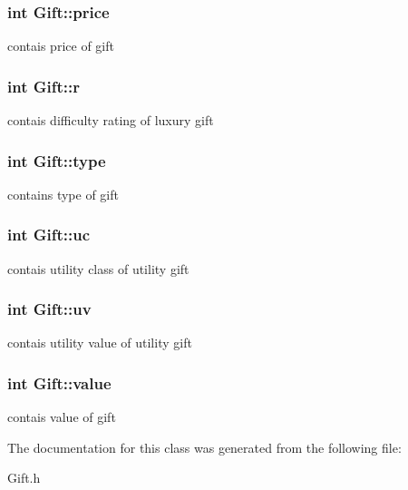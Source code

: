 \subsubsection[{\texorpdfstring{price}{price}}]{\setlength{\rightskip}{0pt plus 5cm}int Gift\+::price}\hypertarget{classGift_ad795362f286e8d5d73514fb64ac478b8}{}\label{classGift_ad795362f286e8d5d73514fb64ac478b8}
contais price of gift 
\subsubsection[{\texorpdfstring{r}{r}}]{\setlength{\rightskip}{0pt plus 5cm}int Gift\+::r}\hypertarget{classGift_a0ab190c8bc8c7fb9e9f03d1330e8364d}{}\label{classGift_a0ab190c8bc8c7fb9e9f03d1330e8364d}
contais difficulty rating of luxury gift 
\subsubsection[{\texorpdfstring{type}{type}}]{\setlength{\rightskip}{0pt plus 5cm}int Gift\+::type}\hypertarget{classGift_a63fb63fdc6f0821417039da90a54ad4c}{}\label{classGift_a63fb63fdc6f0821417039da90a54ad4c}
contains type of gift 
\subsubsection[{\texorpdfstring{uc}{uc}}]{\setlength{\rightskip}{0pt plus 5cm}int Gift\+::uc}\hypertarget{classGift_abd83865cced98ae42e9a05a731afc655}{}\label{classGift_abd83865cced98ae42e9a05a731afc655}
contais utility class of utility gift 
\subsubsection[{\texorpdfstring{uv}{uv}}]{\setlength{\rightskip}{0pt plus 5cm}int Gift\+::uv}\hypertarget{classGift_af1267b1ec483852362e8512ab3bdea5a}{}\label{classGift_af1267b1ec483852362e8512ab3bdea5a}
contais utility value of utility gift 
\subsubsection[{\texorpdfstring{value}{value}}]{\setlength{\rightskip}{0pt plus 5cm}int Gift\+::value}\hypertarget{classGift_a71d14b92ebfd06993afe584f088bc748}{}\label{classGift_a71d14b92ebfd06993afe584f088bc748}
contais value of gift 

The documentation for this class was generated from the following file\+:\begin{DoxyCompactItemize}
\item 
Gift.\+h\end{DoxyCompactItemize}
